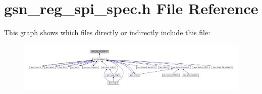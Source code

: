 \hypertarget{a00573}{
\section{gsn\_\-reg\_\-spi\_\-spec.h File Reference}
\label{a00573}
}
This graph shows which files directly or indirectly include this file:
\nopagebreak
\begin{figure}[H]
\begin{center}
\leavevmode
\includegraphics[width=400pt]{a00810}
\end{center}
\end{figure}
